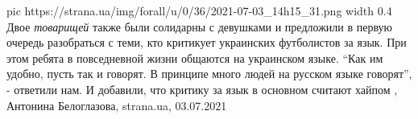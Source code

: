 \ifcmt
  pic https://strana.ua/img/forall/u/0/36/2021-07-03_14h15_31.png
	width 0.4
\fi
Двое \emph{товарищей} также были солидарны с девушками и предложили в первую очередь
разобраться с теми, кто критикует украинских футболистов за язык.  При этом
ребята в повседневной жизни общаются на украинском языке.  \enquote{Как им удобно,
пусть так и говорят. В принципе много людей на русском языке говорят}, -
ответили нам. И добавили, что критику за язык в основном считают хайпом
, 
Антонина Белоглазова, strana.ua, 03.07.2021

